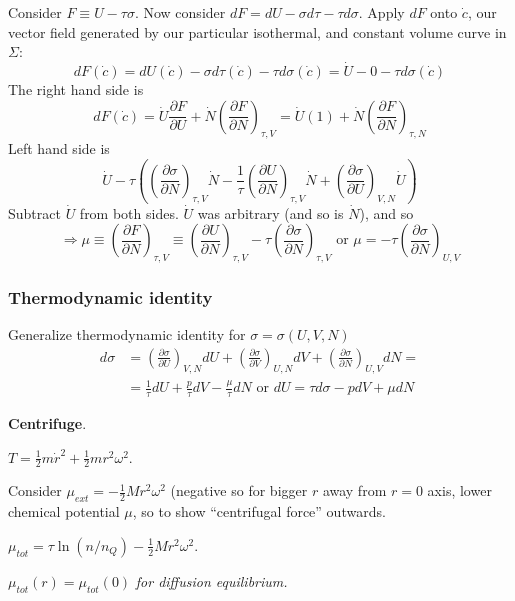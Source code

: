 \documentclass[twoside]{amsart}
\theoremstyle{plain}
\theoremstyle{definition}
\newcommand{\solutionhead}[1]
  {
   \noindent{\small\bf Solution #1.}
   }
\begin{document}
Consider $F \equiv U-\tau \sigma$.  Now consider $dF = dU- \sigma d\tau - \tau d\sigma$.  Apply $dF$ onto $\dot{c}$, our vector field generated by our particular isothermal, and constant volume curve in $\Sigma$:
\[
dF(\dot{c}) = dU(\dot{c}) - \sigma d\tau (\dot{c}) - \tau d\sigma(\dot{c}) = \dot{U}- 0 - \tau d\sigma(\dot{c})
\]
The right hand side is 
\[
dF(\dot{c}) = \dot{U} \frac{ \partial F}{ \partial U} + \dot{N} \left( \frac{ \partial F}{ \partial N} \right)_{\tau,V} = \dot{U}(1) + \dot{N} \left( \frac{ \partial F}{ \partial N} \right)_{\tau,N}
\]
Left hand side is 
\[
\dot{U}- \tau \left( \left( \frac{ \partial \sigma}{ \partial N} \right)_{\tau,V} \dot{N} - \frac{1}{\tau} \left( \frac{ \partial U}{ \partial N} \right)_{\tau,V} \dot{N} + \left( \frac{ \partial \sigma}{ \partial U} \right)_{V,N} \dot{U} \right)
\]
Subtract $\dot{U}$ from both sides.  $\dot{U}$ was arbitrary (and so is $\dot{N}$), and so
\[
\Longrightarrow \mu \equiv \left( \frac{ \partial F}{ \partial N} \right)_{\tau,V} \equiv \left( \frac{\partial U}{ \partial N}\right)_{\tau,V} - \tau \left( \frac{ \partial \sigma}{\partial N}\right)_{\tau,V} \text{ or } \mu = -\tau \left( \frac{ \partial \sigma}{\partial N}\right)_{U,V}
\]

\subsubsection*{Thermodynamic identity} Generalize thermodynamic identity for $\sigma = \sigma(U,V,N)$
\[
\begin{aligned}
  d\sigma & = \left( \frac{ \partial \sigma}{\partial U} \right)_{V,N} dU + \left( \frac{ \partial \sigma}{ \partial V} \right)_{U,N} dV + \left( \frac{ \partial \sigma}{ \partial N} \right)_{U,V} dN = \\
  & = \frac{1}{\tau} dU + \frac{p}{\tau} dV - \frac{\mu}{\tau} dN \text{ or } dU = \tau d\sigma - p dV + \mu dN
\end{aligned}
\]

\solutionhead{1} \textbf{Centrifuge}.  

$T = \frac{1}{2} m \dot{r}^2 + \frac{1}{2} m r^2 \omega^2$.

Consider $\mu_{ext} = - \frac{1}{2} M r^2 \omega^2$  (negative so for bigger $r$ away from $r=0$ axis, lower chemical potential $\mu$, so to show ``centrifugal force'' outwards.  

$\mu_{tot} = \tau \ln{ (n/n_Q)} - \frac{1}{2} M r^2 \omega^2$.  

$\mu_{tot}(r) = \mu_{tot}(0)$ \emph{for diffusion equilibrium.}
\end{document}
